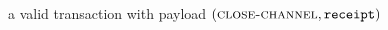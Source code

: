 \begin{algorithm}
  \caption{$\textsc{Closing}\left(\mathtt{receipt}\right)$}
  \label{alg:payfunc}
  \begin{algorithmic}[1]
    \State \Return a valid transaction with payload
    $\left(\textsc{close-channel}, \mathtt{receipt}\right)$
  \end{algorithmic}
\end{algorithm}
